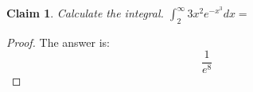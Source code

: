 \documentclass{article}
\newtheorem{theorem}{Claim}
\begin{document}
\begin{theorem}
Calculate the integral. $\int_{2}^{\infty} 3x^{2}e^{-x^{3}}  dx=$
\end{theorem}

\begin{proof}
The answer is:
\[
\frac{1}{e^{8}}
\]
\end{proof}
\end{document}
